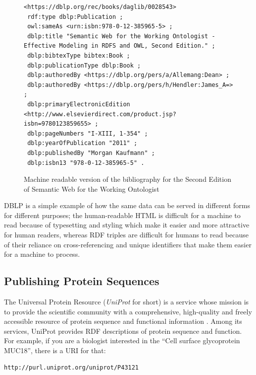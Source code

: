 \begin{figure}
\begin{lstlisting}
<https://dblp.org/rec/books/daglib/0028543>
 rdf:type dblp:Publication ;
 owl:sameAs <urn:isbn:978-0-12-385965-5> ;
 dblp:title "Semantic Web for the Working Ontologist - Effective Modeling in RDFS and OWL, Second Edition." ;
 dblp:bibtexType bibtex:Book ;
 dblp:publicationType dblp:Book ;
 dblp:authoredBy <https://dblp.org/pers/a/Allemang:Dean> ;
 dblp:authoredBy <https://dblp.org/pers/h/Hendler:James_A=> ;
 dblp:primaryElectronicEdition <http://www.elsevierdirect.com/product.jsp?isbn=9780123859655> ;
 dblp:pageNumbers "I-XIII, 1-354" ;
 dblp:yearOfPublication "2011" ;
 dblp:publishedBy "Morgan Kaufmann" ;
 dblp:isbn13 "978-0-12-385965-5" .
\end{lstlisting}
    \caption{Machine readable version of the bibliography for the Second Edition of Semantic Web for the Working Ontologist}
    \label{fig:ch5.4}
\end{figure}

DBLP is a simple example of how the same data can be served in different forms for different
purposes; the human-readable HTML is difficult for a machine to read because of typesetting and styling
which make it easier and more attractive for human readers, whereas RDF triples are difficult for
humans to read because of their reliance on cross-referencing and unique identifiers that make them
easier for a machine to process. 

\subsection{Publishing Protein Sequences}

The Universal Protein Resource (\emph{UniProt} for short) is a service whose mission is to 
provide the scientific community 
with a comprehensive, high-quality and freely accessible resource of protein sequence and 
functional information \cite{10.1093/nar/gky1049}. 
Among its services, UniProt  provides RDF descriptions of protein sequence and
function. For example, if you are a biologist interested in the ``Cell surface
glycoprotein MUC18'', there is a URI for that:

\begin{lstlisting}
http://purl.uniprot.org/uniprot/P43121
\end{lstlisting}


